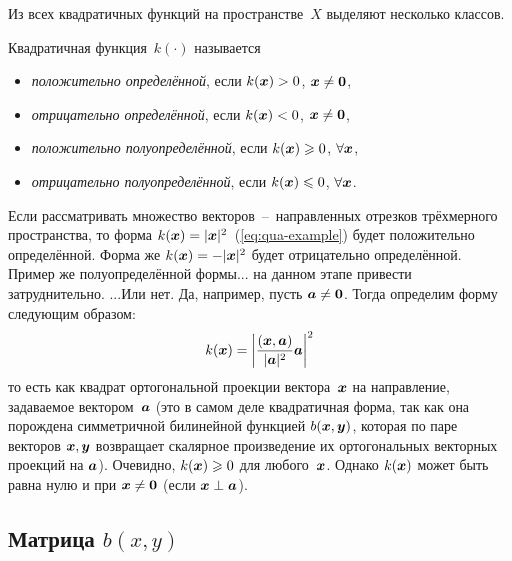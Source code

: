 \documentclass[a4paper,12pt]{article}
\begin{document}
  Из всех квадратичных функций на пространстве~$X$ выделяют несколько классов.
  
  \begin{definition}
    Квадратичная функция~$k(\cdot)$ называется
    \begin{itemize}
      \item \emph{положительно определённой}, если $k(\bds x) \hm> 0$, $\bds x \hm{\not=} \bds 0$,
      \item \emph{отрицательно определённой}, если $k(\bds x) \hm< 0$, $\bds x \hm{\not=} \bds 0$,
      \item \emph{положительно полуопределённой}, если $k(\bds x) \hm\geq 0$, $\forall \boldsymbol x$,
      \item \emph{отрицательно полуопределённой}, если $k(\bds x) \hm\leq 0$, $\forall \boldsymbol x$.
    \end{itemize}
  \end{definition}
  
  \begin{example}
    Если рассматривать множество векторов~--~направленных отрезков трёхмерного пространства, то форма $k(\bds x) \hm= |\bds x|^2$~(\ref{eq:qua-example}) будет положительно определённой.
    Форма же $k(\bds x) \hm= -|\bds x|^2$ будет отрицательно определённой.
    Пример же полуопределённой формы... на данном этапе привести затруднительно.
    ...Или нет.
    Да, например, пусть $\bds a \hm{\not=} \bds 0$.
    Тогда определим форму следующим образом:
    \[
      k(\boldsymbol x) = \left|\frac{(\boldsymbol x, \boldsymbol a)}{|\boldsymbol a|^2} \boldsymbol a\right|^2
    \]
    то есть как квадрат ортогональной проекции вектора~$\boldsymbol x$ на направление, задаваемое вектором~$\boldsymbol a$ (это в самом деле квадратичная форма, так как она порождена симметричной билинейной функцией $b(\boldsymbol x, \boldsymbol y)$, которая по паре векторов $\boldsymbol x, \boldsymbol y$ возвращает скалярное произведение их ортогональных векторных проекций на $\boldsymbol a$).
    Очевидно, $k(\bds x) \hm\geq 0$ для любого~$\boldsymbol x$.
    Однако $k(\boldsymbol x)$ может быть равна нулю и при $\bds x \hm{\not=} \bds 0$ (если $\bds x \hm\perp \bds a$). 
  \end{example}
  
  
  \subsection{Матрица $b(x, y)$}
  
\end{document}
